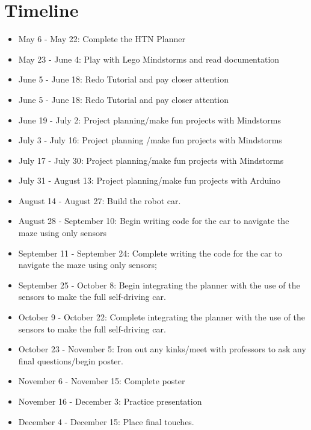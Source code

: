\documentclass[10pt,twocolumn]{article}
\begin{document}
\section{Timeline}
\begin{itemize}
    \item May 6 - May 22: Complete the HTN Planner
    \item May 23 - June 4: Play with Lego Mindstorms and read documentation
    \item June 5 - June 18: Redo Tutorial and pay closer attention
    \item June 5 - June 18: Redo Tutorial and pay closer attention
    \item June 19 - July 2: Project planning/make fun projects with Mindstorms 
    \item July 3 - July 16: Project planning /make fun projects with Mindstorms 
    \item July 17 - July 30: Project planning/make fun projects with Mindstorms  
    \item July 31 - August 13: Project planning/make fun projects with Arduino 
    \item August 14 - August 27: Build the robot car. 
    \item August 28 - September 10: Begin writing code for the car to navigate the maze using only sensors
    \item September 11 - September 24: Complete writing the code for the car to navigate the maze using only sensors;
    \item September 25 - October 8: Begin integrating the planner with the use of the sensors to make the full self-driving car. 
    \item October 9 - October 22:  Complete integrating the planner with the use of the sensors to make the full self-driving car. 
    \item October 23 - November 5: Iron out any kinks/meet with professors to ask any final questions/begin poster. 
    \item November 6 - November 15: Complete poster
    \item November 16 - December 3: Practice presentation
    \item December 4 - December 15: Place final touches. 

\end{itemize}

\printbibliography
\end{document}
